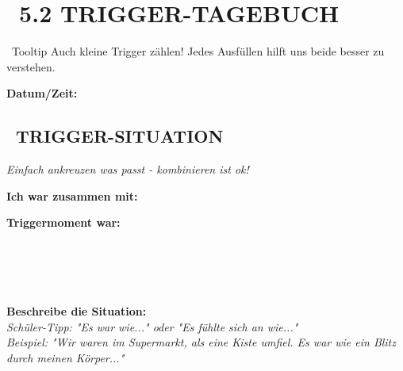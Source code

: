 \newpage
\section*{\faBolt~5.2 TRIGGER-TAGEBUCH}
\label{sec:5.2}

\begin{ctmmYellowBox}{\faLightbulb~Tooltip}
Auch kleine Trigger zählen! Jedes Ausfüllen hilft uns beide besser zu verstehen.
\end{ctmmYellowBox}

\vspace{0.5cm}
\textbf{Datum/Zeit:} 
\vspace{0.5cm}

\subsection*{\faUserFriends~TRIGGER-SITUATION}
\textit{Einfach ankreuzen was passt - kombinieren ist ok!}

\textbf{Ich war zusammen mit:} \\
 \quad
{} \quad
{} \quad
{} 

\vspace{0.5cm}
\textbf{Triggermoment war:} \\
 \quad
{} \\
 \quad
{} \\
 \quad
{} \\
 \quad
{} \\
 

\vspace{0.5cm}
\textbf{Beschreibe die Situation:} \\
\textit{Schüler-Tipp: "Es war wie..." oder "Es fühlte sich an wie..."} \\
\textit{Beispiel: "Wir waren im Supermarkt, als eine Kiste umfiel. Es war wie ein Blitz durch meinen Körper..."} \\

